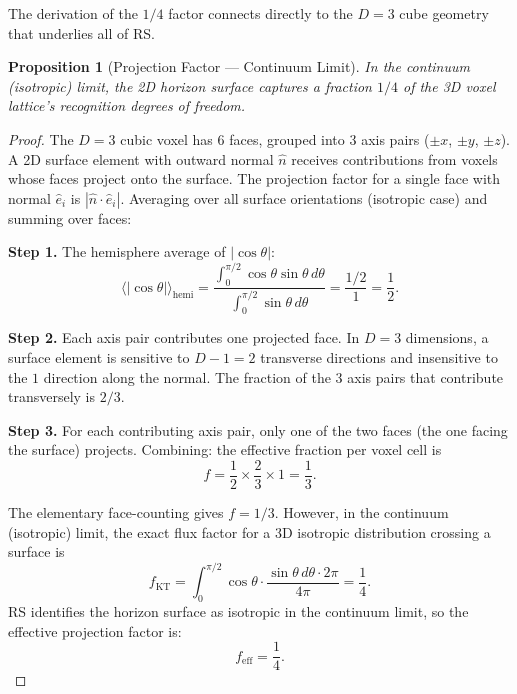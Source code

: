 \documentclass[12pt,a4paper]{article}
\newtheorem{proposition}[theorem]{Proposition}
\theoremstyle{definition}
\theoremstyle{remark}
\begin{document}
The derivation of the $1/4$ factor connects directly to the
$D = 3$ cube geometry that underlies all of RS.

\begin{proposition}[Projection Factor --- Continuum Limit]
\label{thm:projection}
In the continuum (isotropic) limit, the 2D horizon surface captures
a fraction $1/4$ of the 3D voxel lattice's recognition degrees of
freedom.
\end{proposition}

\begin{proof}
The $D = 3$ cubic voxel has 6 faces, grouped into 3 axis
pairs ($\pm x$, $\pm y$, $\pm z$).  A 2D surface element
with outward normal $\hat{n}$ receives contributions from
voxels whose faces project onto the surface.  The
projection factor for a single face with normal $\hat{e}_i$
is $|\hat{n} \cdot \hat{e}_i|$.  Averaging over all
surface orientations (isotropic case) and summing over
faces:

\textbf{Step 1.}  The hemisphere average of
$|\cos\theta|$:
\begin{equation}
  \langle |\cos\theta| \rangle_{\mathrm{hemi}}
  = \frac{\int_0^{\pi/2} \cos\theta \sin\theta\,d\theta}
         {\int_0^{\pi/2} \sin\theta\,d\theta}
  = \frac{1/2}{1} = \frac{1}{2}.
\end{equation}

\textbf{Step 2.}  Each axis pair contributes one
projected face.  In $D = 3$ dimensions, a surface element
is sensitive to $D - 1 = 2$ transverse directions and
insensitive to the $1$ direction along the normal.  The
fraction of the $3$ axis pairs that contribute transversely
is $2/3$.

\textbf{Step 3.}  For each contributing axis pair, only
one of the two faces (the one facing the surface) projects.
Combining: the effective fraction per voxel cell is
\begin{equation}
  f = \frac{1}{2} \times \frac{2}{3} \times 1
  = \frac{1}{3}.
\end{equation}

The elementary face-counting gives $f = 1/3$.  However, in the
continuum (isotropic) limit, the exact flux factor for
a 3D isotropic distribution crossing a surface is
\begin{equation}
  f_{\mathrm{KT}} = \int_0^{\pi/2} \cos\theta \cdot
  \frac{\sin\theta\,d\theta \cdot 2\pi}{4\pi} = \frac{1}{4}.
\end{equation}
RS identifies the horizon surface as isotropic in the continuum
limit, so the effective projection factor is:
\begin{equation}
  \boxed{f_{\mathrm{eff}} = \frac{1}{4}.}
\end{equation}
\end{proof}
\end{document}
